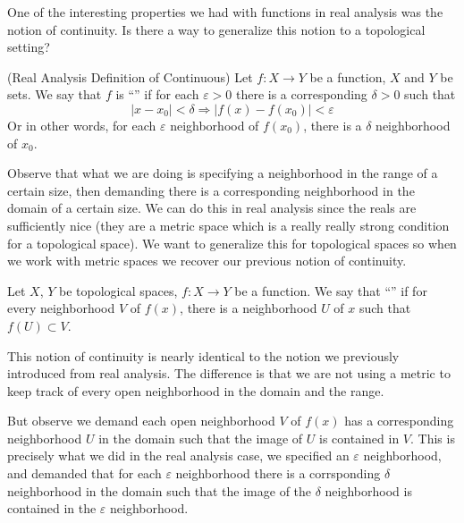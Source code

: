 \begin{prob}
One of the interesting properties we had with functions in real
analysis was the notion of continuity. Is there a way to generalize
this notion to a topological setting?
\end{prob}
\begin{defn}{(Real Analysis Definition of Continuous)}
Let $f:X\to Y$ be a function, $X$ and $Y$ be sets. We say that $f$ is
``'' if for each $\varepsilon>0$ there is a
corresponding $\delta>0$ such that
\begin{equation}
|x-x_{0}|<\delta\Rightarrow|f(x)-f(x_0)|<\varepsilon
\end{equation}
Or in other words, for each $\varepsilon$ neighborhood of $f(x_0)$,
there is a $\delta$ neighborhood of $x_0$.
\end{defn}
\begin{rmk}
Observe that what we are doing is specifying a neighborhood in the
range of a certain size, then demanding there is a corresponding
neighborhood in the domain of a certain size. We can do this in real
analysis since the reals are sufficiently nice (they are a metric
space which is a really really strong condition for a topological
space). We want to generalize this for topological spaces so when we
work with metric spaces we recover our previous notion of continuity.
\end{rmk}
\begin{defn}
Let $X$, $Y$ be topological spaces, $f:X\to Y$ be a function. We say
that ``'' if for every neighborhood
$V$ of $f(x)$, there is a neighborhood $U$ of $x$ such that
$f(U)\subset V$.
\end{defn}
\begin{rmk}
This notion of continuity is nearly identical to the notion we
previously introduced from real analysis. The difference is that we
are not using a metric to keep track of every open neighborhood in the
domain and the range.

But observe we demand each open neighborhood $V$ of $f(x)$ has a
corresponding neighborhood $U$ in the domain such that the image of
$U$ is contained in $V$. This is precisely what we did in the real
analysis case, we specified an $\varepsilon$ neighborhood, and
demanded that for each $\varepsilon$ neighborhood there is a
corrsponding $\delta$ neighborhood in the domain such that the image
of the $\delta$ neighborhood is contained in the $\varepsilon$
neighborhood.
\end{rmk}


